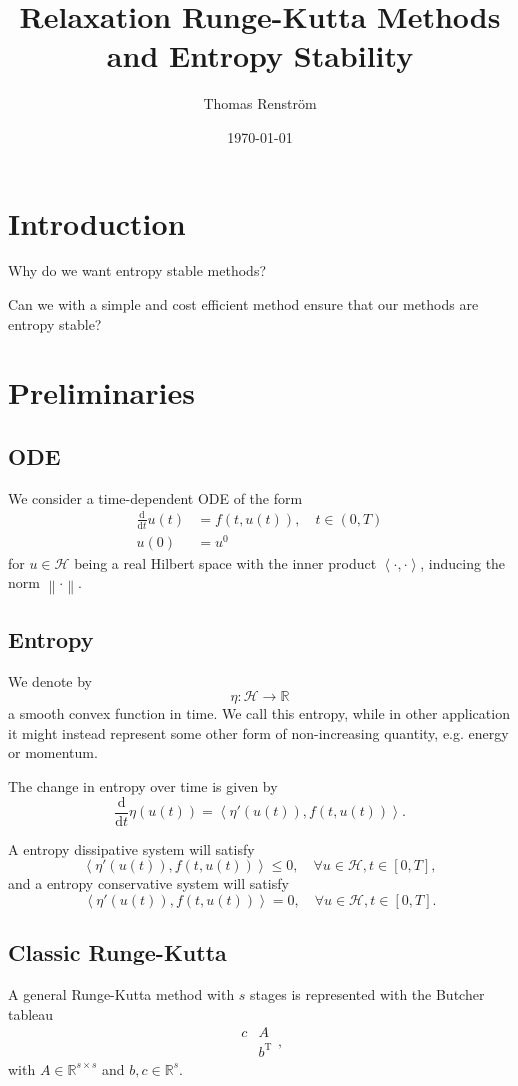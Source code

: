 \documentclass{report}
\title{Relaxation Runge-Kutta Methods and Entropy Stability}
\author{Thomas Renström}
\date{\today}
\newcommand{\norm}[1]{\left\lVert#1\right\rVert}
\newcommand{\inner}[2]{\left< #1 , #2 \right>}
\newcommand{\T}{\mathrm{T}}
\begin{document}
\chapter{Introduction}

Why do we want entropy stable methods?

Can we with a simple and cost efficient method ensure that our methods are entropy stable?


\chapter{Preliminaries}
\section{ODE}
    We consider a time-dependent ODE of the form
    \begin{align*}
        \frac{\text{d}}{\text{d}t} u(t) &= f(t, u(t)), \quad t \in (0, T)\\
        u(0) &= u^0
    \end{align*}
    for \(u \in \mathcal{H}\) being a real Hilbert space with the inner product \(\inner{\cdot}{\cdot}\), inducing the norm \(\norm{\cdot}\).


\section{Entropy}
    We denote by
    \[ \eta: \mathcal{H} \rightarrow \mathbb{R}\]
    a smooth convex function in time.
    We call this entropy, while in other application it might instead represent some other form of non-increasing quantity, e.g. energy or momentum.

    The change in entropy over time is given by
    \[\frac{\text{d}}{\text{d}t} \eta (u(t)) = \inner{\eta'(u(t))}{f(t, u(t))}.\]

    \vspace*{5mm}
    A entropy dissipative system will satisfy
    \[\inner{\eta'(u(t))}{f(t, u(t))} \leq 0, \quad \forall u \in \mathcal{H}, t \in [0, T],\]
    and a entropy conservative system will satisfy
    \[\inner{\eta'(u(t))}{f(t, u(t))} = 0, \quad \forall u \in \mathcal{H}, t \in [0, T].\]


\section{Classic Runge-Kutta}
    A general Runge-Kutta method with \(s\) stages is represented with the Butcher tableau
    \[\begin{array}{c|c}
        c & A\\
        \hline
        ~ & b^{\T}
    \end{array},\]
    with \(A \in \mathbb{R}^{s \times s}\) and \(b, c \in \mathbb{R}^s.\)
\end{document}
